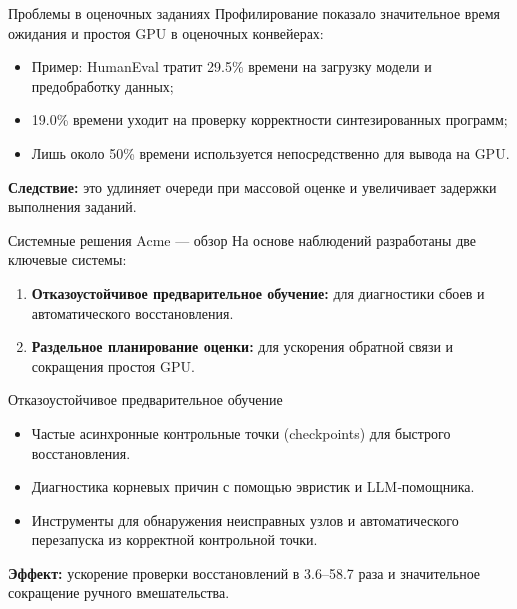 \begin{frame}{Проблемы в оценочных заданиях}
	Профилирование показало значительное время ожидания и простоя GPU в оценочных конвейерах:
	\begin{itemize}
		\item Пример: HumanEval тратит 29.5\% времени на загрузку модели и предобработку данных;
		\item 19.0\% времени уходит на проверку корректности синтезированных программ;
		\item Лишь около 50\% времени используется непосредственно для вывода на GPU.
	\end{itemize}
	
	\textbf{Следствие:} это удлиняет очереди при массовой оценке и увеличивает задержки выполнения заданий.
\end{frame}

\begin{frame}{Системные решения Acme — обзор}
	На основе наблюдений разработаны две ключевые системы:
	\begin{enumerate}
		\item \textbf{Отказоустойчивое предварительное обучение:} для диагностики сбоев и автоматического восстановления.
		\item \textbf{Раздельное планирование оценки:} для ускорения обратной связи и сокращения простоя GPU.
	\end{enumerate}
\end{frame}

\begin{frame}{Отказоустойчивое предварительное обучение}
	\begin{itemize}
		\item Частые асинхронные контрольные точки (checkpoints) для быстрого восстановления.
		\item Диагностика корневых причин с помощью эвристик и LLM‑помощника.
		\item Инструменты для обнаружения неисправных узлов и автоматического перезапуска из корректной контрольной точки.
	\end{itemize}
	\textbf{Эффект:} ускорение проверки восстановлений в 3.6–58.7 раза и значительное сокращение ручного вмешательства.
\end{frame}

